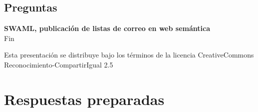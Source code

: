 \documentclass[spanish,notes=hide]{beamer}
\begin{document}
\subsection{Preguntas}
\frame
{

  \begin{center}
    \LARGE{\textbf{SWAML, publicación de listas de correo en web semántica}}\\
    \vspace{1cm}
    \LARGE{Fin}\\
    \vspace{2cm}
    \begin{tiny}
	Esta presentación se distribuye bajo los términos de la licencia
	CreativeCommons Reconocimiento-CompartirIgual 2.5
    \end{tiny}
  \end{center}
}

\appendix

\section{Respuestas preparadas}
\end{document}

